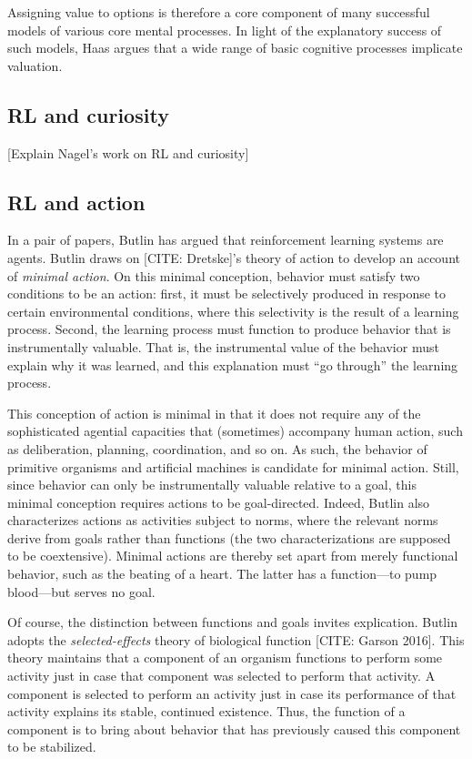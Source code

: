 Assigning value to options is therefore a core component of many successful models of various core mental processes.
In light of the explanatory success of such models, Haas argues that a wide range of basic cognitive processes implicate valuation.

\subsection{RL and curiosity}

[Explain Nagel's work on RL and curiosity]

\subsection{RL and action}

In a pair of papers, Butlin has argued that reinforcement learning systems are agents.
Butlin draws on [CITE: Dretske]'s theory of action to develop an account of \emph{minimal action}.
On this minimal conception, behavior must satisfy two conditions to be an action: first, it must be selectively produced in response to certain environmental conditions, where this selectivity is the result of a learning process.
Second, the learning process must function to produce behavior that is instrumentally valuable.
That is, the instrumental value of the behavior must explain why it was learned, and this explanation must ``go through'' the learning process.

This conception of action is minimal in that it does not require any of the sophisticated agential capacities that (sometimes) accompany human action, such as deliberation, planning, coordination, and so on.
As such, the behavior of primitive organisms and artificial machines is candidate for minimal action.
Still, since behavior can only be instrumentally valuable relative to a goal, this minimal conception requires actions to be goal-directed.
Indeed, Butlin also characterizes actions as activities subject to norms, where the relevant norms derive from goals rather than functions (the two characterizations are supposed to be coextensive).
Minimal actions are thereby set apart from merely functional behavior, such as the beating of a heart.
The latter has a function---to pump blood---but serves no goal.

Of course, the distinction between functions and goals invites explication.
Butlin adopts the \emph{selected-effects} theory of biological function [CITE: Garson 2016].
This theory maintains that a component of an organism functions to perform some activity just in case that component was selected to perform that activity.
A component is selected to perform an activity just in case its performance of that activity explains its stable, continued existence.
Thus, the function of a component is to bring about behavior that has previously caused this component to be stabilized. 

